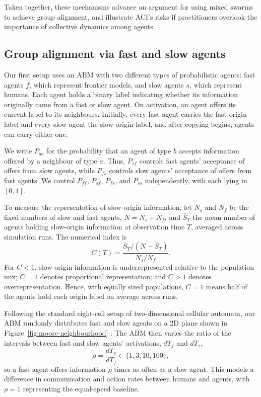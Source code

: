 Taken together, these mechanisms advance an argument for using mixed swarms to achieve group alignment, and illustrate ACI’s risks if practitioners overlook the importance of collective dynamics among agents.

\subsection{Group alignment via fast and slow agents}

Our first setup uses an ABM with two different types of probabilistic agents: fast agents $f$, which represent frontier models, and slow agents $s$, which represent humans. Each agent holds a binary label indicating whether its information originally came from a fast or slow agent. On activation, an agent offers its current label to its neighbours. Initially, every fast agent carries the fast-origin label and every slow agent the slow-origin label, and after copying begins, agents can carry either one. 

We write $P_{ab}$ for the probability that an agent of type $b$ accepts information offered by a neighbour of type $a$. Thus, $P_{sf}$ controls fast agents' acceptance of offers from slow agents, while $P_{fs}$ controls slow agents' acceptance of offers from fast agents. We control $P_{ff}$, $P_{sf}$, $P_{fs}$, and $P_{ss}$ independently, with each lying in $[0,1]$.

To measure the representation of slow-origin information, let $N_s$ and $N_f$ be the fixed numbers of slow and fast agents, $N=N_s+N_f$, and $\bar S_T$ the mean number of agents holding slow-origin information at observation time $T$, averaged across simulation runs. The numerical index is
\begin{equation}
    C(T)=\frac{\bar S_T/(N-\bar S_T)}{N_s/N_f}.
    \label{eq:representation-index}
\end{equation}
For $C<1$, slow-origin information is underrepresented relative to the population mix; $C=1$ denotes proportional representation; and $C>1$ denotes overrepresentation. Hence, with equally sized populations, $C=1$ means half of the agents hold each origin label on average across runs.

Following the standard eight-cell setup of two-dimensional cellular automata, our ABM randomly distributes fast and slow agents on a 2D plane shown in Figure~\ref{fig:moore-neighbourhood} \parencite{wolfram1983}. The ABM then varies the ratio of the intervals between fast and slow agents' activations, $dT_f$ and $dT_s$,
\begin{equation}
    \rho=\frac{dT_s}{dT_f}\in\{1,3,10,100\},
\end{equation}
so a fast agent offers information $\rho$ times as often as a slow agent. This models a difference in communication and action rates between humans and agents, with $\rho=1$ representing the equal-speed baseline.

